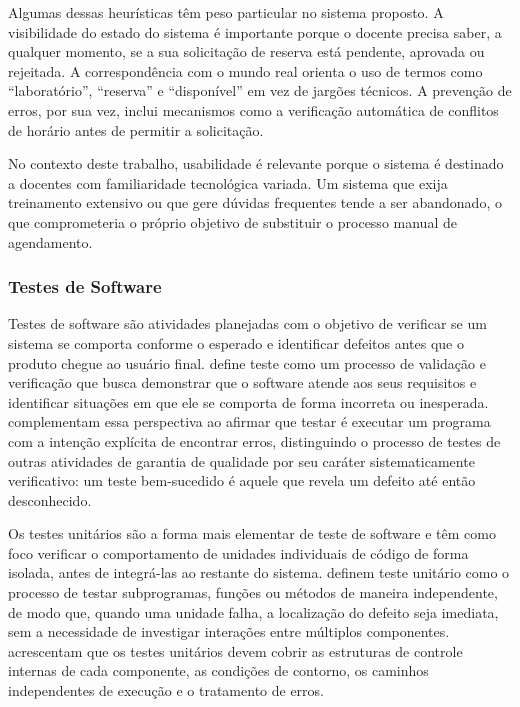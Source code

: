 \documentclass[
	12pt,				%
	twoside,			%
	openany,			%
	a4paper,			%
	chapter=TITLE,		%
	section=TITLE,		%
	subsection=TITLE,	%
	subsubsection=TITLE,%
	english,			%
	french,				%
	spanish,			%
	brazil,				%
	]{abntex2}
\begin{document}
Algumas dessas heurísticas têm peso particular no sistema proposto. A visibilidade do estado do sistema é importante porque o docente precisa saber, a qualquer momento, se a sua solicitação de reserva está pendente, aprovada ou rejeitada. A correspondência com o mundo real orienta o uso de termos como ``laboratório'', ``reserva'' e ``disponível'' em vez de jargões técnicos. A prevenção de erros, por sua vez, inclui mecanismos como a verificação automática de conflitos de horário antes de permitir a solicitação.

No contexto deste trabalho, usabilidade é relevante porque o sistema é destinado a docentes com familiaridade tecnológica variada. Um sistema que exija treinamento extensivo ou que gere dúvidas frequentes tende a ser abandonado, o que comprometeria o próprio objetivo de substituir o processo manual de agendamento.
\subsubsection{Testes de Software}
\label{sec:testes}

Testes de software são atividades planejadas com o objetivo de verificar se um sistema se comporta conforme o esperado e identificar defeitos antes que o produto chegue ao usuário final.  define teste como um processo de validação e verificação que busca demonstrar que o software atende aos seus requisitos e identificar situações em que ele se comporta de forma incorreta ou inesperada.  complementam essa perspectiva ao afirmar que testar é executar um programa com a intenção explícita de encontrar erros, distinguindo o processo de testes de outras atividades de garantia de qualidade por seu caráter sistematicamente verificativo: um teste bem-sucedido é aquele que revela um defeito até então desconhecido.

Os testes unitários são a forma mais elementar de teste de software e têm como foco verificar o comportamento de unidades individuais de código de forma isolada, antes de integrá-las ao restante do sistema.  definem teste unitário como o processo de testar subprogramas, funções ou métodos de maneira independente, de modo que, quando uma unidade falha, a localização do defeito seja imediata, sem a necessidade de investigar interações entre múltiplos componentes.  acrescentam que os testes unitários devem cobrir as estruturas de controle internas de cada componente, as condições de contorno, os caminhos independentes de execução e o tratamento de erros.
\end{document}
